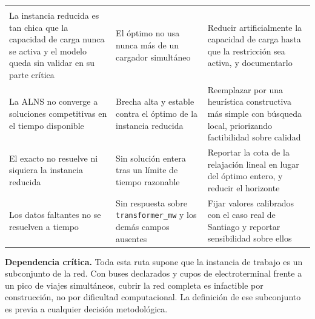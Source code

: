 \documentclass[11pt,a4paper,parskip=half]{scrartcl}
\begin{document}
\begin{longtable}{@{}L{5.6cm}L{4.6cm}L{5.2cm}@{}}
 &  &  \\
\endfirsthead
{}
 &  &  \\
\endhead
\midrule
La instancia reducida es tan chica que la capacidad de carga nunca se activa y el modelo queda sin validar en su parte crítica &
El óptimo no usa nunca más de un cargador simultáneo &
Reducir artificialmente la capacidad de carga hasta que la restricción sea activa, y documentarlo \\
\addlinespace
{}
La ALNS no converge a soluciones competitivas en el tiempo disponible &
Brecha alta y estable contra el óptimo de la instancia reducida &
Reemplazar por una heurística constructiva más simple con búsqueda local, priorizando factibilidad sobre calidad \\
\addlinespace
El exacto no resuelve ni siquiera la instancia reducida &
Sin solución entera tras un límite de tiempo razonable &
Reportar la cota de la relajación lineal en lugar del óptimo entero, y reducir el horizonte \\
\addlinespace
{}
Los datos faltantes no se resuelven a tiempo &
Sin respuesta sobre \texttt{transformer\_mw} y los demás campos ausentes &
Fijar valores calibrados con el caso real de Santiago \citep{galarza_pilotstoscale_2020} y reportar sensibilidad sobre ellos \\
\bottomrule
\end{longtable}

\begin{nota}
\textbf{\textcolor{ink}{Dependencia crítica.}} Toda esta ruta supone que la instancia de trabajo es un subconjunto de la red. Con \flotaDeclarada{} buses declarados y \cuposTotales{} cupos de electroterminal frente a un pico de \picoSimultaneo{} viajes simultáneos, cubrir la red completa es infactible por construcción, no por dificultad computacional. La definición de ese subconjunto es previa a cualquier decisión metodológica.
\end{nota}

\clearpage
\renewcommand{\refname}{Referencias citadas}

\end{document}
